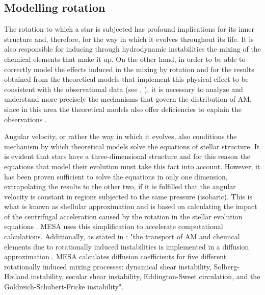 \documentclass[fleqn,usenatbib]{mnras}
\begin{document}
\subsection{Modelling rotation}
The rotation to which a star is subjected has profound implications for its inner structure and, therefore, for the way in which it evolves throughout its life. It is also responsible for inducing through hydrodynamic instabilities the mixing of the chemical elements that make it up. On the other hand, in order to be able to correctly model the effects induced in the mixing by rotation and for the results obtained from the theoretical models that implement this physical effect to be consistent with the observational data (see \citet{Pinsonneault1997}, \citet{Maeder2000}), it is necessary to analyze and understand more precisely the mechanisms that govern the distribution of AM, since in this area the theoretical models also offer deficiencies to explain the observations \citep{Denissenkov2007}. \par

Angular velocity, or rather the way in which it evolves, also conditions the mechanism by which theoretical models solve the equations of stellar structure. It is evident that stars have a three-dimensional structure and for this reason the equations that model their evolution must take this fact into account. However, it has been proven sufficient to solve the equations in only one dimension, extrapolating the results to the other two, if it is fulfilled that the angular velocity is constant in regions subjected to the same pressure (isobaric). This is what is known as shellular approximation \citep{Meynet1997} and is based on calculating the impact of the centrifugal acceleration caused by the rotation in the stellar evolution equations \citep{Endal1976}. MESA uses this simplification to accelerate computational calculations. Additionally, as stated in \citet{Paxton2013}: "the transport of AM and chemical elements due to rotationally induced instabilities is implemented in a diffusion approximation \citet{Endal1978}. MESA calculates diffusion coefficients for five different rotationally induced mixing processes: dynamical shear instability, Solberg-H{\o}iland instability, secular shear instability, Eddington-Sweet circulation, and the Goldreich-Schubert-Fricke instability".\par
\end{document}
